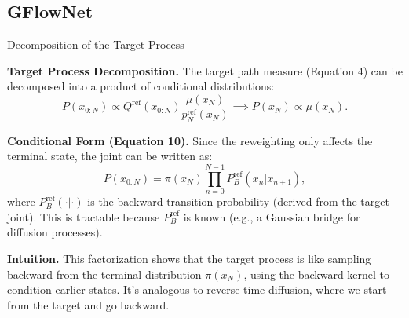 \documentclass[aspectratio=169,xcolor=dvipsnames]{beamer}
\begin{document}



\subsection{GFlowNet}

\begin{frame}[t]{Decomposition of the Target Process}
\footnotesize

\textbf{Target Process Decomposition.} The target path measure (Equation 4) can be decomposed into a product of conditional distributions:
\[
P(x_{0:N}) \propto Q^{\text{ref}}(x_{0:N}) \frac{\mu(x_N)}{p^{\text{ref}}_N(x_N)} \implies P(x_N) \propto \mu(x_N).
\]

\textbf{Conditional Form (Equation 10).} Since the reweighting only affects the terminal state, the joint can be written as:
\[
P(x_{0:N}) = \pi(x_N) \prod_{n=0}^{N-1} P_B^{\text{ref}}(x_n | x_{n+1}),
\]
where $P_B^{\text{ref}}(\cdot | \cdot)$ is the backward transition probability (derived from the target joint). This is tractable because $P_B^{\text{ref}}$ is known (e.g., a Gaussian bridge for diffusion processes).

\textbf{Intuition.} This factorization shows that the target process is like sampling backward from the terminal distribution $\pi(x_N)$, using the backward kernel to condition earlier states. It's analogous to reverse-time diffusion, where we start from the target and go backward.

\end{frame}
\end{document}
